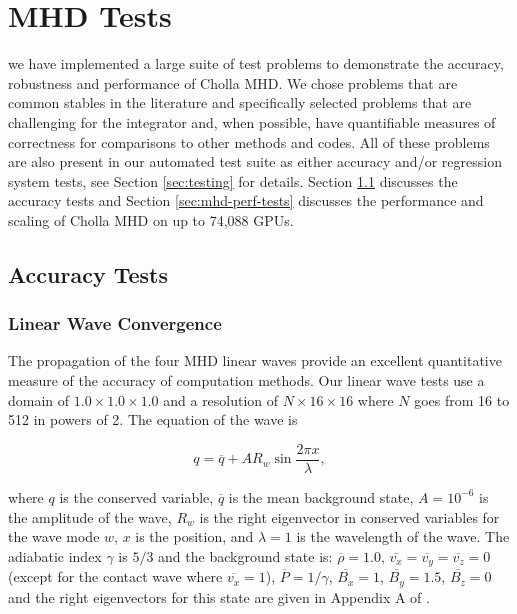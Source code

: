 \section{MHD Tests}
\label{sec:mhd-tests}

we have implemented a large suite of test problems to demonstrate the accuracy, robustness and performance of Cholla MHD. We chose problems that are common stables in the literature and specifically selected problems that are challenging for the integrator and, when possible, have quantifiable measures of correctness for comparisons to other methods and codes. All of these problems are also present in our automated test suite as either accuracy and/or regression system tests, see Section \ref{sec:testing} for details. Section \ref{sec:accuracy_tests} discusses the accuracy tests and Section \ref{sec:mhd-perf-tests} discusses the performance and scaling of Cholla MHD on up to 74,088 GPUs.

\subsection{Accuracy Tests}
\label{sec:accuracy_tests}

\subsubsection{Linear Wave Convergence}
\label{sec:lwc}

The propagation of the four MHD linear waves provide an excellent quantitative measure of the accuracy of computation methods. Our linear wave tests use a domain of $1.0\times1.0\times1.0$ and a resolution of $N\times16\times16$ where $N$ goes from 16 to 512 in powers of 2. The equation of the wave is

\begin{equation}
    q = \overline{q} + A R_w \sin{\frac{2\pi x}{\lambda}},
\end{equation}

\noindent where $q$ is the conserved variable, $\overline{q}$ is the mean background state, $A=10^{-6}$ is the amplitude of the wave, $R_w$ is the right eigenvector in conserved variables for the wave mode $w$, $x$ is the position, and $\lambda=1$ is the wavelength of the wave. The adiabatic index $\gamma$ is $5/3$ and the background state is: 
$\overline{\rho}=1.0$,
$\overline{v_x}=\overline{v_y}=\overline{v_z}=0$ (except for the contact wave where $\overline{v_x} = 1$),
$\overline{P}=1/\gamma$,
$\overline{B_x}=1$,
$\overline{B_y}=1.5$,
$\overline{B_z}=0$ 
and the right eigenvectors for this state are given in Appendix A of \cite{gardiner_unsplit_2008}. 

